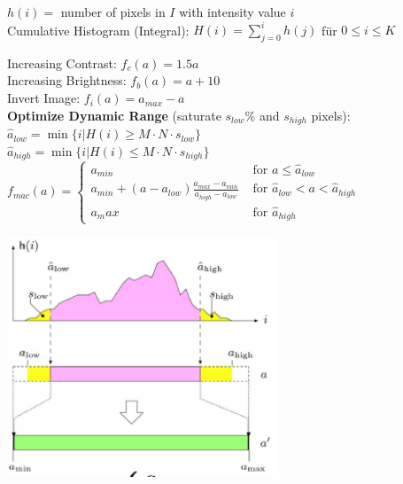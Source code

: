 \begin{minipage}{11cm}

  $h(i) = $ number of pixels in $I$ with intensity value $i$\\
  
  Cumulative Histogram (Integral): $H(i) = \sum_{j=0}^i h(j)$ für $0 \leq i \leq K$
  
  Increasing Contrast: $f_c(a) = 1.5 a$\\
  Increasing Brightness: $f_b(a) = a + 10$\\
  Invert Image: $f_i(a) = a_{max} - a$\\

  \textbf{Optimize Dynamic Range} (saturate $s_{low}$\% and $s_{high}$ pixels): \\
  $\hat{a}_{low} = \min\{i | H(i) \geq M \cdot N \cdot s_{low}\}$\\
  $\hat{a}_{high} = \min\{i | H(i) \leq M \cdot N \cdot s_{high}\}$\\
  
  $f_{mac}(a) = \begin{cases}
  a_{min} & \text{ for } a \leq \hat{a}_{low}\\
  a_{min} + (a-a_{low}) \frac{a_{max} - a_{min}}{a_{high} - a_{low}} & \text{ for } \hat{a}_{low} < a < \hat{a}_{high}\\
  a_max & \text{ for } \hat{a}_{high}
  \end{cases}$
  
  \includegraphics[width=8cm]{./images/automatic_contrast.png}
\end{minipage}
